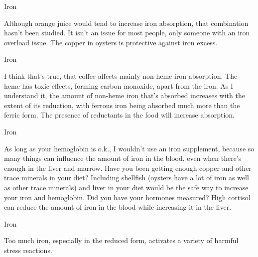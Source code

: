 \documentclass[11pt,oneside,openany,extrafontsizes]{memoir}
\begin{document}
\begin{standalonequote}{Iron}

    \begin{answer}
        Although orange juice would tend to increase iron absorption, that combination hasn't been studied. It isn't an issue for most people, only someone with an iron overload issue. The copper in oysters is protective against iron excess.
    \end{answer}
\end{standalonequote}

\begin{standalonequote}{Iron}

    \begin{answer}
        I think that's true, that coffee affects mainly non-heme iron absorption. The heme has toxic effects, forming carbon monoxide, apart from the iron. As I understand it, the amount of non-heme iron that's absorbed increases with the extent of its reduction, with ferrous iron being absorbed much more than the ferric form. The presence of reductants in the food will increase absorption. 
    \end{answer}
\end{standalonequote}

\begin{standalonequote}{Iron}

    \begin{answer}
        As long as your hemoglobin is o.k., I wouldn't use an iron supplement, because so many things can influence the amount of iron in the blood, even when there's enough in the liver and marrow. Have you been getting enough copper and other trace minerals in your diet? Including shellfish (oysters have a lot of iron as well as other trace minerals) and liver in your diet would be the safe way to increase your iron and hemoglobin. Did you have your hormones measured? High cortisol can reduce the amount of iron in the blood while increasing it in the liver.
    \end{answer}
\end{standalonequote}

\begin{standalonequote}{Iron}

    \begin{answer}
        Too much iron, especially in the reduced form, activates a variety of harmful stress reactions.
    \end{answer}
\end{standalonequote}
\end{document}
